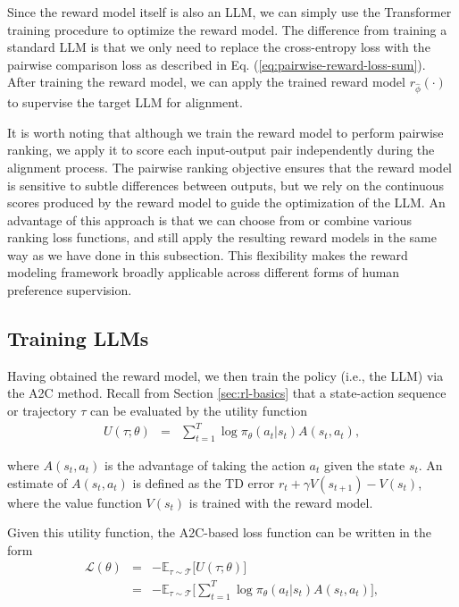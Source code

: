 \noindent Since the reward model itself is also an LLM, we can simply use the Transformer training procedure to optimize the reward model. The difference from training a standard LLM is that we only need to replace the cross-entropy loss with the pairwise comparison loss as described in Eq. (\ref{eq:pairwise-reward-loss-sum}). After training the reward model, we can apply the trained reward model $r_{\hat{\phi}}(\cdot)$ to supervise the target LLM for alignment.

It is worth noting that although we train the reward model to perform pairwise ranking, we apply it to score each input-output pair independently during the alignment process. The pairwise ranking objective ensures that the reward model is sensitive to subtle differences between outputs, but we rely on the continuous scores produced by the reward model to guide the optimization of the LLM. An advantage of this approach is that we can choose from or combine various ranking loss functions, and still apply the resulting reward models in the same way as we have done in this subsection. This flexibility makes the reward modeling framework broadly applicable across different forms of human preference supervision.

\subsection{Training LLMs}
\label{sec:rlhf-training-llms}

\noindent Having obtained the reward model, we then train the policy (i.e., the LLM) via the A2C method. Recall from Section \ref{sec:rl-basics} that a state-action sequence or trajectory $\tau$ can be evaluated by the utility function
\begin{eqnarray}
U(\tau;\theta) & = &  \sum_{t=1}^{T} \log \pi_{\theta}(a_t|s_t) A(s_t,a_t), \label{eq:utility-basic-form}
\end{eqnarray}

\noindent where $A(s_t,a_t)$ is the advantage of taking the action $a_t$ given the state $s_t$. An estimate of $A(s_t,a_t)$ is defined as the TD error $ r_t + \gamma V(s_{t+1}) - V(s_t)$, where the value function $V(s_t)$ is trained with the reward model.

Given this utility function, the A2C-based loss function can be written in the form
\begin{eqnarray}
\mathcal{L}(\theta) & = & -\mathbb{E}_{\tau \sim \mathcal{T}} \big[U(\tau;\theta) \big] \nonumber \\
          & = & -\mathbb{E}_{\tau \sim \mathcal{T}} \big[ \sum_{t=1}^{T} \log \pi_{\theta}(a_t|s_t) A(s_t,a_t) \big],
\end{eqnarray}

